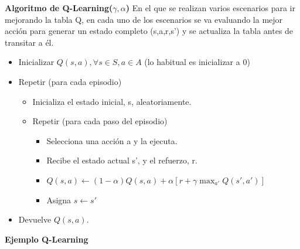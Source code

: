 \documentclass[12pt]{report} %
\begin{document}
\textbf{Algoritmo de Q-Learning($\gamma, \alpha$)}
En el que se realizan varios escenarios para ir mejorando la tabla Q, en cada uno de los escenarios se va evaluando la mejor acción para generar un estado completo (s,a,r,s') y se actualiza la tabla antes de transitar a él.
\begin{itemize}
  \item Inicializar $Q(s, a), \forall s \in S, a \in A$ (lo habitual es inicializar a 0)
  \item Repetir (para cada episodio)
  \begin{itemize}
    \item Inicializa el estado inicial, s, aleatoriamente.
    \item Repetir (para cada paso del episodio)
    \begin{itemize}
      \item Selecciona una acción a y la ejecuta.
      \item Recibe el estado actual s', y el refuerzo, r.
      \item $Q(s,a) \leftarrow (1-\alpha) Q(s,a) + \alpha[r + \gamma \max_{a'} Q(s',a')]$      
      \item Asigna $s \leftarrow s'$
    \end{itemize}
  \end{itemize}
  \item Devuelve $Q(s, a)$.
\end{itemize}

\newpage

\textbf{Ejemplo Q-Learning}
\end{document}
